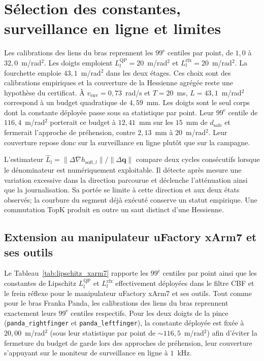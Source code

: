\section*{Sélection des constantes, surveillance en ligne et limites}

Les calibrations des liens du bras reprennent les $99^{\text{e}}$ centiles par point, de $1{,}0$ à $32{,}0$~m/rad$^2$. Les doigts emploient $L_l^{\mathrm{QP}}=20$~m/rad$^2$ et $L_l^{\mathrm{rfx}}=20$~m/rad$^2$. La fourchette emploie $43{,}1$~m/rad$^2$ dans les deux étages. Ces choix sont des calibrations empiriques et la couverture de la Hessienne agrégée reste une hypothèse du certificat. À $v_{\mathrm{env}}=0{,}73$~rad/s et $T=20$~ms, $L=43{,}1$~m/rad$^2$ correspond à un budget quadratique de $4{,}59$~mm. Les doigts sont le seul corps dont la constante déployée passe sous sa statistique par point. Leur $99^{\text{e}}$ centile de $116{,}4$~m/rad$^2$ porterait ce budget à $12{,}41$~mm sur les $15$~mm de $d_{\mathrm{safe}}$ et fermerait l'approche de préhension, contre $2{,}13$~mm à $20$~m/rad$^2$. Leur couverture repose donc sur la surveillance en ligne plutôt que sur la campagne.

L'estimateur $\hat L_l=\|\Delta\nabla h_{\mathrm{soft},l}\|/\|\Delta\mathbf q\|$ compare deux cycles consécutifs lorsque le dénominateur est numériquement exploitable. Il détecte après mesure une variation excessive dans la direction parcourue et déclenche l'atténuation ainsi que la journalisation. Sa portée se limite à cette direction et aux deux états observés; la courbure du segment déjà exécuté conserve un statut empirique. Une commutation TopK produit en outre un saut distinct d'une Hessienne.

\subsection*{Extension au manipulateur uFactory xArm7 et ses outils}

Le Tableau~\ref{tab:lipschitz_xarm7} rapporte les $99^{\text{e}}$ centiles par point ainsi que les constantes de Lipschitz $L_l^{\mathrm{QP}}$ et $L_l^{\mathrm{rfx}}$ effectivement déployées dans le filtre CBF et le frein réflexe pour le manipulateur uFactory xArm7 et ses outils. Tout comme pour le bras Franka Panda, les calibrations des liens du bras reprennent exactement leurs $99^{\text{e}}$ centiles respectifs. Pour les deux doigts de la pince (\texttt{panda\_rightfinger} et \texttt{panda\_leftfinger}), la constante déployée est fixée à $20{,}00$~m/rad$^2$ (sous leur statistique par point de ${\sim}116{,}5$~m/rad$^2$) afin d'éviter la fermeture du budget de garde lors des approches de préhension, leur couverture s'appuyant sur le moniteur de surveillance en ligne à $1$~kHz.


